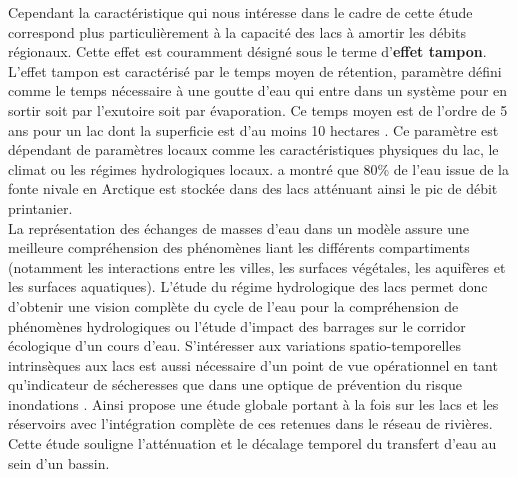 Cependant la caractéristique qui nous intéresse dans le cadre de cette étude correspond plus particulièrement à la capacité des lacs à amortir les débits régionaux. Cette effet est couramment désigné sous le terme d'\textbf{effet tampon}. L'effet tampon est caractérisé par le temps moyen de rétention, paramètre défini comme le temps nécessaire à une goutte d'eau qui entre dans un système pour en sortir soit par l'exutoire soit par évaporation. Ce temps moyen est de l'ordre de 5 ans pour un lac dont la superficie est d'au moins 10 hectares \citep{messager2016}. Ce paramètre est dépendant de paramètres locaux comme les caractéristiques physiques du lac, le climat ou les régimes hydrologiques locaux. \citet{bowling2010} a montré que 80\% de l'eau issue de la fonte nivale en Arctique est stockée dans des lacs atténuant ainsi le pic de débit printanier. \\
La représentation des échanges de masses d'eau dans un modèle assure une meilleure compréhension des phénomènes liant les différents compartiments (notamment les interactions entre les villes, les surfaces végétales, les aquifères et les surfaces aquatiques). L’étude du régime hydrologique des lacs permet donc d'obtenir une vision complète du cycle de l’eau pour la compréhension de phénomènes hydrologiques ou l’étude d’impact des barrages sur le corridor écologique d’un cours d’eau. S'intéresser aux variations spatio-temporelles intrinsèques aux lacs est aussi nécessaire d'un point de vue opérationnel en tant qu'indicateur de sécheresses que dans une optique de prévention du risque inondations \citep{oki2006}. Ainsi \citet{zajac2017} propose une étude globale portant à la fois sur les lacs et les réservoirs avec l'intégration complète de ces retenues dans le réseau de rivières. Cette étude souligne l'atténuation et le décalage temporel du transfert d'eau au sein d'un bassin. \\

